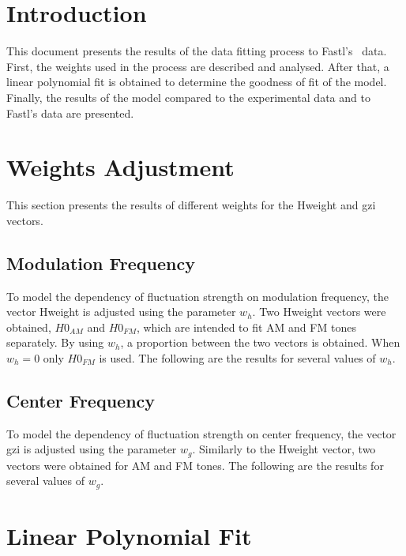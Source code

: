\documentclass{article}
\begin{document}

\section{Introduction}
\label{sec:introduction}

This document presents the results of the data fitting process to
Fastl's~\cite{Fastl2007Psychoacoustics} data. First, the weights used in the
process are described and analysed. After that, a linear polynomial fit is
obtained to determine the goodness of fit of the model. Finally, the results
of the model compared to the experimental data and to Fastl's data are
presented.

\section{Weights Adjustment}
\label{sec:weights_adjustment}

This section presents the results of different weights for the Hweight and gzi
vectors.

\subsection{Modulation Frequency}
\label{sub:modulation_frequency}

To model the dependency of fluctuation strength on modulation frequency, the
vector Hweight is adjusted using the parameter $w_h$. Two Hweight vectors were
obtained, $H0_{AM}$ and $H0_{FM}$, which are intended to fit AM and FM tones
separately. By using $w_h$, a proportion between the two vectors is obtained.
When $w_h=0$ only $H0_{FM}$ is used. The following are the results for several
values of $w_h$.

\subsection{Center Frequency}
\label{sub:center_frequency}

To model the dependency of fluctuation strength on center frequency, the vector
gzi is adjusted using the parameter $w_g$. Similarly to the Hweight vector, two
vectors were obtained for AM and FM tones. The following are the results for
several values of $w_g$.


\section{Linear Polynomial Fit}
\label{sec:linear_polynomial_fit}
\end{document}
